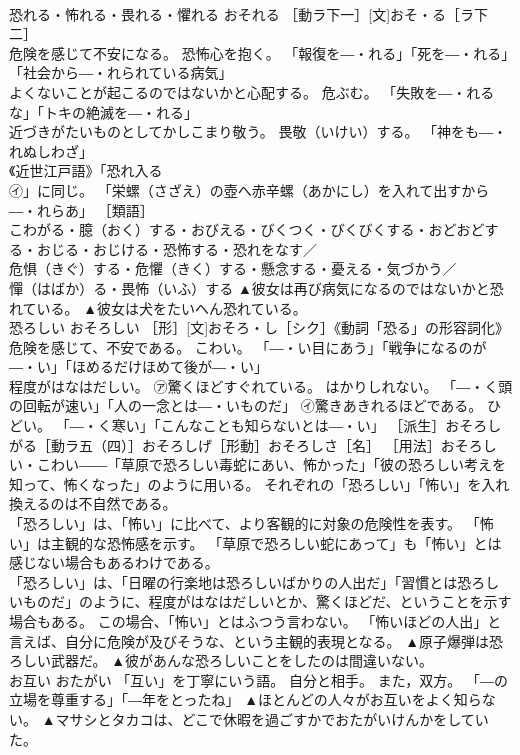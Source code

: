\documentclass[8pt]{extreport}
\begin{document}
\begin{CJK}{UTF8}{min}
\\	恐れる・怖れる・畏れる・懼れる	おそれる	［動ラ下一］[文]おそ・る［ラ下二］ 
\\	危険を感じて不安になる。 恐怖心を抱く。 「報復を―・れる」「死を―・れる」「社会から―・れられている病気」 
\\	よくないことが起こるのではないかと心配する。 危ぶむ。 「失敗を―・れるな」「トキの絶滅を―・れる」 
\\	近づきがたいものとしてかしこまり敬う。 畏敬（いけい）する。 「神をも―・れぬしわざ」 
\\	《近世江戸語》「恐れ入る 
\\	㋑」に同じ。 「栄螺（さざえ）の壺へ赤辛螺（あかにし）を入れて出すから―・れらあ」 ［類語］
\\	こわがる・臆（おく）する・おびえる・びくつく・びくびくする・おどおどする・おじる・おじける・恐怖する・恐れをなす／
\\	危惧（きぐ）する・危懼（きく）する・懸念する・憂える・気づかう／
\\	憚（はばか）る・畏怖（いふ）する	▲彼女は再び病気になるのではないかと恐れている。 ▲彼女は犬をたいへん恐れている。
\\	恐ろしい	おそろしい	［形］[文]おそろ・し［シク］《動詞「恐る」の形容詞化》 
\\	危険を感じて、不安である。 こわい。 「―・い目にあう」「戦争になるのが―・い」「ほめるだけほめて後が―・い」 
\\	程度がはなはだしい。 ㋐驚くほどすぐれている。 はかりしれない。 「―・く頭の回転が速い」「人の一念とは―・いものだ」 ㋑驚きあきれるほどである。 ひどい。 「―・く寒い」「こんなことも知らないとは―・い」 ［派生］おそろしがる［動ラ五（四）］おそろしげ［形動］おそろしさ［名］ ［用法］おそろしい・こわい――「草原で恐ろしい毒蛇にあい、怖かった」「彼の恐ろしい考えを知って、怖くなった」のように用いる。 それぞれの「恐ろしい」「怖い」を入れ換えるのは不自然である。 
\\	「恐ろしい」は、「怖い」に比べて、より客観的に対象の危険性を表す。 「怖い」は主観的な恐怖感を示す。 「草原で恐ろしい蛇にあって」も「怖い」とは感じない場合もあるわけである。 
\\	「恐ろしい」は、「日曜の行楽地は恐ろしいばかりの人出だ」「習慣とは恐ろしいものだ」のように、程度がはなはだしいとか、驚くほどだ、ということを示す場合もある。 この場合、「怖い」とはふつう言わない。 「怖いほどの人出」と言えば、自分に危険が及びそうな、という主観的表現となる。	▲原子爆弾は恐ろしい武器だ。 ▲彼があんな恐ろしいことをしたのは間違いない。
\\	お互い	おたがい	「互い」を丁寧にいう語。 自分と相手。 また，双方。 「―の立場を尊重する」「―年をとったね」	▲ほとんどの人々がお互いをよく知らない。 ▲マサシとタカコは、どこで休暇を過ごすかでおたがいけんかをしていた。

\end{CJK}
\end{document}
